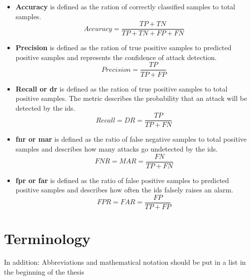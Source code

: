 \begin{itemize}
	\item \textbf{Accuracy} is defined as the ration of correctly classified samples to total samples. \begin{equation}
	Accuracy = \frac{TP + TN}{TP + TN + FP + FN}
	\end{equation}
	
	\item \textbf{Precision} is defined as the ration of true positive samples to predicted positive samples and represents the confidence of attack detection.
	 \begin{equation}
	Precision = \frac{TP}{TP + FP}
	\end{equation}
	
	\item \textbf{Recall or \gls{dr}} is defined as the ration of true positive samples to total positive samples. The metric describes the probability that an attack will be detected by the \gls{ids}.
	\begin{equation}
	Recall = DR = \frac{TP}{TP + FN}
	\end{equation}
	
	\item \textbf{\gls{fnr} or \gls{mar}} is defined as the ratio of false negative samples to total positive samples and describes how many attacks go undetected by the \gls{ids}.
	\begin{equation}
	FNR = MAR = \frac{FN}{TP + FN}
	\end{equation}
	
	\item \textbf{\gls{fpr} or \gls{far}} is defined as the ratio of false positive samples to predicted positive samples and describes how often the \gls{ids} falsely raises an alarm.
	\begin{equation}
	FPR = FAR = \frac{FP}{TP + FP}
	\end{equation}
\end{itemize}

\section{Terminology} \label{sec:background:terminology}

\printglossaries

In addition: Abbreviations and mathematical notation should be put in a list in the beginning of the thesis 

\newpage